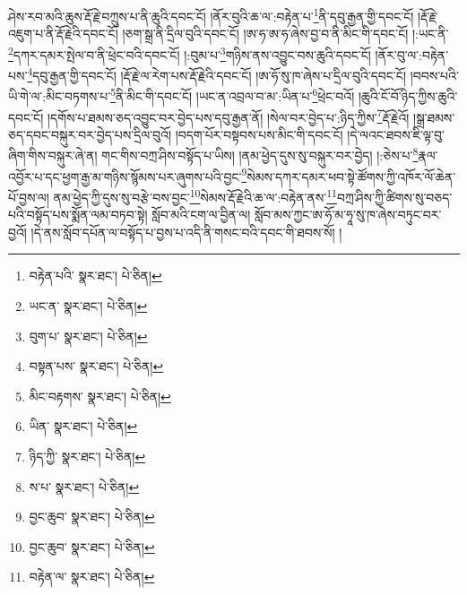 ཤེས་རབ་མའི་ཆུས་རྡོ་རྗེ་བཀྲུས་པ་ནི་ཆུའི་དབང་ངོ། །ནོར་བུའི་ཆ་ལ་:བརྟེན་པ་\footnote{བརྟེན་པའི་  སྣར་ཐང་།  པེ་ཅིན། }ནི་དབུ་རྒྱན་གྱི་དབང་ངོ། །རྡོ་རྗེ་འཇུག་པ་ནི་རྡོ་རྗེའི་དབང་ངོ། །ཅག་སྒྲ་ནི་དྲིལ་བུའི་དབང་ངོ། །ཨ་ཧ་ཨ་ཧ་ཞེས་བྱ་བ་ནི་མིང་གི་དབང་ངོ། །:ཡང་ནི་\footnote{ཡང་ན་  སྣར་ཐང་།  པེ་ཅིན། }དཀར་དམར་སྤེལ་བ་ནི་ཕྲེང་བའི་དབང་ངོ། །:བུམ་པ་\footnote{བུག་པ་  སྣར་ཐང་།  པེ་ཅིན། }གཉིས་ནས་འབྱུང་བས་ཆུའི་དབང་ངོ། །ནོར་བུ་ལ་:བརྟེན་པས་\footnote{བསྟན་པས་  སྣར་ཐང་།  པེ་ཅིན། }དབུ་རྒྱན་གྱི་དབང་ངོ། །རྡོ་རྗེ་ལ་རེག་པས་རྡོ་རྗེའི་དབང་ངོ། །ཨ་ཧོ་སུ་ཁ་ཞེས་པ་དྲིལ་བུའི་དབང་ངོ། །བབས་པའི་ཡི་གེ་ལ་:མིང་བཏགས་པ་\footnote{མིང་བརྟགས་  སྣར་ཐང་།  པེ་ཅིན། }ནི་མིང་གི་དབང་ངོ། །ཡང་ན་འབྲལ་བ་མ་:ཡིན་པ་\footnote{ཡིན་  སྣར་ཐང་།  པེ་ཅིན། }ཕྲེང་བའོ། །ཆུའི་ངོ་བོ་ཉིད་ཀྱིས་ཆུའི་དབང་ངོ། །དགོས་པ་ཐམས་ཅད་འབྱུང་བར་བྱེད་པས་དབུ་རྒྱན་ནོ། །སེལ་བར་བྱེད་པ་:ཉིད་ཀྱིས་\footnote{ཉིད་ཀྱི་  སྣར་ཐང་།  པེ་ཅིན། }རྡོ་རྗེའོ། །སྒྲ་ཐམས་ཅད་དབང་བསྐུར་བར་བྱེད་པས་དྲིལ་བུའོ། །བདག་པོར་བསྟབས་པས་མིང་གི་དབང་ངོ། །དེ་ལའང་ཐབས་ཇི་ལྟ་བུ་ཞིག་གིས་བསྐུར་ཞེ་ན། གང་གིས་བཀྲ་ཤིས་བསྟོད་པ་ཡིས། །ནམ་ཕྱེད་དུས་སུ་བསྐུར་བར་བྱེད། །:ཅེས་པ་\footnote{ས་པ་  སྣར་ཐང་།  པེ་ཅིན། }རྣལ་འབྱོར་པ་དང་ཕྱག་རྒྱ་མ་གཉིས་སྙོམས་པར་ཞུགས་པའི་བྱང་\footnote{བྱང་ཆུབ་  སྣར་ཐང་།  པེ་ཅིན། }སེམས་དཀར་དམར་ཕབ་སྟེ་ཚོགས་ཀྱི་འཁོར་ལོ་ཆེན་པོ་བྱས་ལ། ནམ་ཕྱེད་ཀྱི་དུས་སུ་བརྩེ་བས་བྱང་\footnote{བྱང་ཆུབ་  སྣར་ཐང་།  པེ་ཅིན། }སེམས་རྡོ་རྗེའི་ཆ་ལ་:བརྟེན་ནས་\footnote{བརྟེན་ལ་  སྣར་ཐང་།  པེ་ཅིན། }བཀྲ་ཤིས་ཀྱི་ཚིགས་སུ་བཅད་པའི་བསྟོད་པས་སྨོན་ལམ་བཏབ་སྟེ། སློབ་མའི་ངག་ལ་བྱིན་ལ། སློབ་མས་ཀྱང་ཨ་ཧོ་མ་ཧཱ་སུ་ཁ་ཞེས་བཏུང་བར་བྱའོ། །དེ་ནས་སློབ་དཔོན་ལ་བསྟོད་པ་བྱས་པ་འདི་ནི་གསང་བའི་དབང་གི་ཐབས་སོ། །
